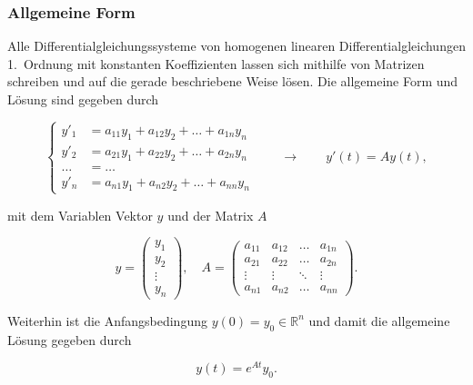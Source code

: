 \subsubsection{Allgemeine Form}

Alle Differentialgleichungssysteme von homogenen linearen Differentialgleichungen 1.\ Ordnung mit konstanten Koeffizienten lassen sich mithilfe von Matrizen schreiben und auf die gerade beschriebene Weise lösen. Die allgemeine Form und Lösung sind gegeben durch

\begin{equation*}
    \left\{ \begin{aligned}
        y'_1 &= a_{11} y_1 + a_{12} y_2 + \ldots + a_{1n} y_n \\
        y'_2 &= a_{21} y_1 + a_{22} y_2 + \ldots + a_{2n} y_n \\
        \dots &= \dots \\
        y'_n &= a_{n1} y_1 + a_{n2} y_2 + \ldots + a_{nn} y_n
    \end{aligned} \right. \qquad \longrightarrow \qquad
    y'(t) = A y(t),
\end{equation*}

\vspace{0.25\baselineskip}

mit dem Variablen Vektor \( y \) und der Matrix \( A \)

\begin{equation*}
    y = \begin{pmatrix}
        y_1 \\
        y_2 \\
        \vdots \\
        y_n
    \end{pmatrix}, \quad A = \begin{pmatrix}
        a_{11} & a_{12} & \ldots & a_{1n} \\
        a_{21} & a_{22} & \ldots & a_{2n} \\
        \vdots & \vdots & \ddots & \vdots \\
        a_{n1} & a_{n2} & \ldots & a_{nn}
    \end{pmatrix}.
\end{equation*}
 
Weiterhin ist die Anfangsbedingung \( y(0) = y_0 \in \mathbb{R}^n \) und damit die allgemeine Lösung gegeben durch 

\begin{equation*}
    y(t) = e^{At} y_0.
\end{equation*}

